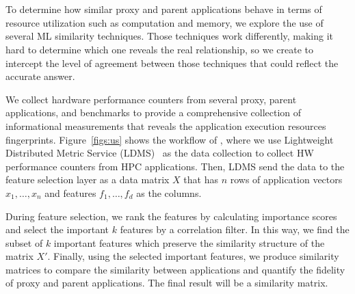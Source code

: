 \section{\us}
\label{sec:simEngine}
To determine how similar proxy and parent applications behave in terms of resource utilization such as computation and memory, we explore the use of several ML similarity techniques. Those techniques work differently, making it hard to determine which one reveals the real relationship, so we create \us to intercept the level of agreement between those techniques that could reflect the accurate answer. 

We collect hardware performance counters from several proxy, parent applications, and benchmarks to provide a comprehensive collection of informational measurements that reveals the application execution resources fingerprints.  
Figure~\ref{figs:us} shows the workflow of \us, where we use Lightweight Distributed Metric Service (LDMS)~\cite{ldms_sandia} as the data collection to collect HW performance counters from HPC applications. Then, LDMS send the data to the feature selection layer as a data matrix $X$ that has $n$ rows of application vectors $x_{1},\ldots,x_{n}$ and features $f_{1},\ldots,f_{d}$ as the columns.


During feature selection, we rank the features by calculating importance scores and select the important $k$ features by a correlation filter.
In this way, we find the subset of $k$ important features which preserve the similarity structure of the matrix $X'$. 
Finally, using the selected important features, we produce similarity matrices to compare the similarity between applications and quantify the fidelity of proxy and parent applications. The final result will be a similarity matrix. 

